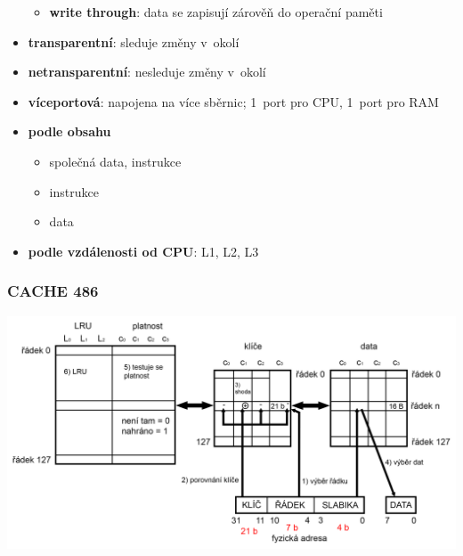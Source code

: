 \documentclass[a4paper,12pt]{article}
\providecommand{\tightlist}{%
\setlength{\itemsep}{0pt}\setlength{\parskip}{0pt}}
\begin{document}
\begin{itemize}
\begin{itemize}
\begin{itemize}
    \end{itemize}
    \item \textbf{write through}: data se zapisují zárověň do operační paměti
  \end{itemize}
  \item \textbf{transparentní}: sleduje změny v~okolí
  \item \textbf{netransparentní}: nesleduje změny v~okolí
  \item \textbf{víceportová}: napojena na více sběrnic; 1~port pro CPU, 1~port
  pro RAM
  \item \textbf{podle obsahu}
  \begin{itemize}
    \tightlist
    \item společná data, instrukce
    \item instrukce
    \item data
  \end{itemize}
  \item \textbf{podle vzdálenosti od CPU}: L1, L2, L3
\end{itemize}

\subsubsection{CACHE 486}

\includegraphics[width=\textwidth]{ref/cache-486.png}
\end{document}
